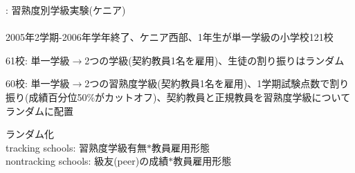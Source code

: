 \begin{frame}{}
\citet{DufloDupasKremer2011}: 習熟度別学級実験(ケニア)\\~\\
\pause
2005年2学期-2006年学年終了、ケニア西部、1年生が単一学級の小学校121校
\begin{description}
\vspace{1.0ex}\setlength{\itemsep}{1.0ex}\setlength{\baselineskip}{12pt}
\pause
\item[統御群]	61校: 単一学級$\rightarrow$2つの学級(契約教員1名を雇用)、生徒の割り振りはランダム
\pause
\item[治療群]	60校: 単一学級$\rightarrow$2つの習熟度学級(契約教員1名を雇用)、1学期試験点数で割り振り(成績百分位50\%がカットオフ)、契約教員と正規教員を習熟度学級についてランダムに配置
\end{description}
\pause
\vspace*{1ex}
ランダム化\\
\pause
tracking schools: 習熟度学級有無$*$教員雇用形態\\
\pause
nontracking schools: 級友(peer)の成績$*$教員雇用形態
\end{frame}

